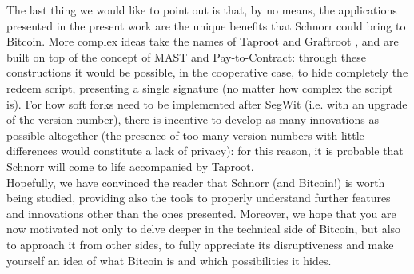 \bigskip
\noindent
The last thing we would like to point out is that, by no means, the applications presented in the present work are the unique benefits that Schnorr could bring to Bitcoin. More complex ideas take the names of Taproot \cite{Taproot} and Graftroot \cite{Graftroot}, and are built on top of the concept of MAST and Pay-to-Contract: through these constructions it would be possible, in the cooperative case, to hide completely the redeem script, presenting a single signature (no matter how complex the script is). For how soft forks need to be implemented after SegWit (i.e. with an upgrade of the version number), there is incentive to develop as many innovations as possible altogether (the presence of too many version numbers with little differences would constitute a lack of privacy): for this reason, it is probable that Schnorr will come to life accompanied by Taproot. 
\\
Hopefully, we have convinced the reader that Schnorr (and Bitcoin!) is worth being studied, providing also the tools to properly understand further features and innovations other than the ones presented. Moreover, we hope that you are now motivated not only to delve deeper in the technical side of Bitcoin, but also to approach it from other sides, to fully appreciate its disruptiveness and make yourself an idea of what Bitcoin is and which possibilities it hides.